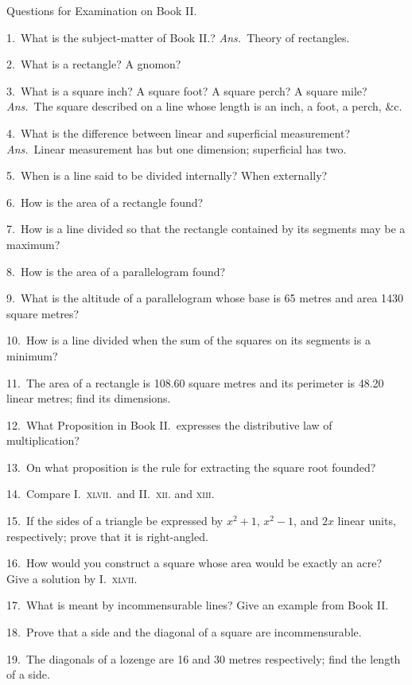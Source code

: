 \documentclass[oneside]{book}
\newcommand\exhead[1]{
\Needspace*{5\baselineskip}\begin{center}
\textsf{#1}
\end{center}
}
\begin{document}
\exhead{Questions for Examination on Book II\@.}

\begin{footnotesize}
1.~What is the subject-matter of Book II\@.? \emph{Ans.}\ Theory of
rectangles.

2.~What is a rectangle? A gnomon?

3.~What is a square inch? A square foot? A square perch?
A square mile? \emph{Ans.}\ The square described on a line whose
length is an inch, a foot, a perch, \&c.

4.~What is the difference between linear and superficial measurement?
\emph{Ans.}\ Linear measurement has but one dimension;
superficial has two.

5.~When is a line said to be divided internally? When externally?

6.~How is the area of a rectangle found?

7.~How is a line divided so that the rectangle contained by its
segments may be a maximum?

8.~How is the area of a parallelogram found?

9.~What is the altitude of a parallelogram whose base is 65
metres and area 1430 square metres?

10.~How is a line divided when the sum of the squares on its
segments is a minimum?

11.~The area of a rectangle is 108.60 square metres and its
perimeter is 48.20 linear metres; find its dimensions.

12.~What Proposition in Book II\@.\ expresses the distributive
law of multiplication?

13.~On what proposition is the rule for extracting the square
root founded?

14.~Compare I.~\textsc{xlvii.}\ and II\@.~\textsc{xii.} and \textsc{xiii}.

15.~If the sides of a triangle be expressed by $x^2 + 1$, $x^2 - 1$,
and $2x$ linear units, respectively; prove that it is right-angled.


16.~How would you construct a square whose area would be
exactly an acre? Give a solution by I.~\textsc{xlvii}.

17.~What is meant by incommensurable lines? Give an example
from Book II\@.

18.~Prove that a side and the diagonal of a square are incommensurable.

19.~The diagonals of a lozenge are 16 and 30 metres respectively;
find the length of a side.


\end{footnotesize}
\end{document}
